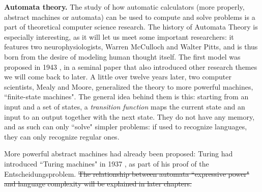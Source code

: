 \documentclass[../main.tex]{subfiles}
\begin{document}
\vspace{4pt}
\textbf{Automata theory.}
The study of how automatic calculators (more properly, abstract machines or automata) can be used to compute and solve problems is a part of theoretical computer science research. The history of Automata Theory is especially interesting, as it will let us meet some important researchers: it features two neurophysiologists, Warren McCulloch and Walter Pitts, and is thus born from the desire of modeling human thought itself. The first model was proposed in 1943 \cite{mccullochLogicalCalculusIdeas1943}, in a seminal paper that also introduced other research themes we will come back to later. A little over twelve years later, two computer scientists, Mealy and Moore, generalized the theory to more powerful machines, ``finite-state machines". The general idea behind them is this: starting from an input and a set of states, a \textit{transition function} maps the current state and an input to an output together with the next state. They do not have any memory, and as such can only ``solve" simpler problems: if used to recognize languages, they can only recognize regular ones.

More powerful abstract machines had already been proposed: Turing had introduced ``Turing machines" in 1937 \cite{turingComputableNumbersApplication1937}, as part of his proof of the Entscheidungsproblem. \sout{The relationship between automata ``expressive power" and language complexity will be explained in later chapters.} 
\end{document}
